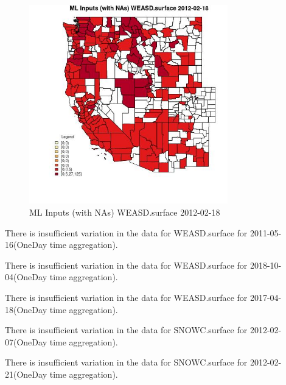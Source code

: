 \begin{figure} 
\centering  
\includegraphics[width=0.77\textwidth]{Code_Outputs/Report_ML_input_PM25_Step4_part_f_de_duplicated_aveswNAs_CountyWEASDsurfaceMean2012-02-18.jpg} 
\caption{\label{fig:Report_ML_input_PM25_Step4_part_f_de_duplicated_aveswNAsCountyWEASDsurfaceMean2012-02-18}ML Inputs (with NAs) WEASD.surface 2012-02-18} 
\end{figure} 
 

There is insufficient variation in the data for WEASD.surface for 2011-05-16(OneDay time aggregation). 
 

There is insufficient variation in the data for WEASD.surface for 2018-10-04(OneDay time aggregation). 
 

There is insufficient variation in the data for WEASD.surface for 2017-04-18(OneDay time aggregation). 
 

There is insufficient variation in the data for SNOWC.surface for 2012-02-07(OneDay time aggregation). 
 

There is insufficient variation in the data for SNOWC.surface for 2012-02-21(OneDay time aggregation). 
 

\clearpage 


